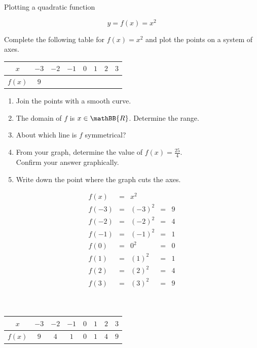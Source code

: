 \begin{wex}{Plotting a quadratic function}
{
\begin{equation*}
 y = f(x) = x^{2}
\end{equation*}

Complete the following table for $f(x)=x^{2}$ and plot the points on a system of axes.
\\
\begin{center}
\begin{tabular}{|c|c|c|c|c|c|c|c|}
\hline
  $x$ &  $-3$ & $-2$ & $-1$ & $0$ & $1$ & $2$ & $3$
\\ \hline
 $f(x)$& $9$ &&&&&&
\\ \hline
\end{tabular}
\end{center}
\vspace{10pt}
\begin{enumerate}[noitemsep, label=\textbf{\arabic*}. ] 
 \item Join the points with a smooth curve.
\item The domain of $f$ is $x \in \mathBB{R}$. Determine the range.
\item About which line is $f$ symmetrical?
\item From your graph, determine the value of $f(x) = \frac{25}{4}$. \\Confirm your answer graphically.
\item Write down the point where the graph cuts the axes.
\end{enumerate}
}
{
\begin{equation*}
 \begin{array}{cclcc}
  f(x) &=& x^{2} & &\\
 f(-3) &=& (-3)^{2} &=& 9 \\ 
 f(-2) &=& (-2)^{2} &=& 4 \\
 f(-1) &=& (-1)^{2} &=& 1 \\
f(0) &=& 0^{2} &= &0 \\
f(1) &=& (1)^{2} &= &1 \\ 
f(2) &=& (2)^{2} &= &4 \\
f(3) &=& (3)^{2} &= &9
 \end{array}
\end{equation*}
\\
\\
\begin{center}
\begin{tabular}{|c|c|c|c|c|c|c|c|}
\hline
  $x$ &  $-3$ & $-2$ & $-1$ & $0$ & $1$ & $2$ & $3$
\\ \hline
 $f(x)$& $9$ &$4$&$1$&$0$&$1$&$4$&$9$
\\ \hline
\end{tabular}
\end{center}

}
\end{wex}
